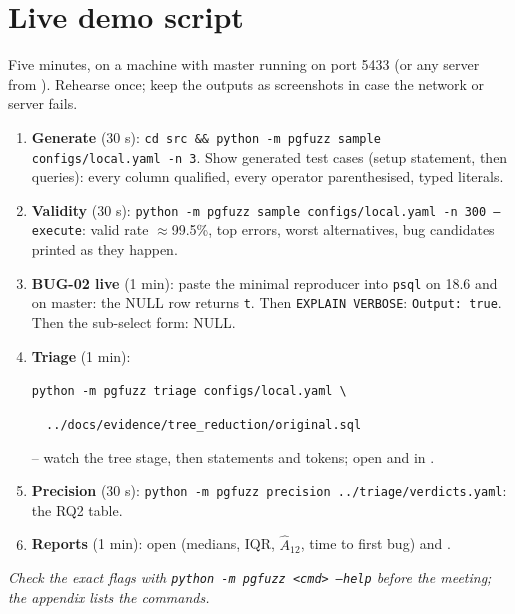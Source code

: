 \section{Live demo script}
\label{sec:demo}

Five minutes, on a machine with master running on port 5433 (or any server
from ). Rehearse once; keep the outputs as
screenshots in case the network or server fails.

\begin{enumerate}
  \item \textbf{Generate} (30 s): \texttt{cd src \&\& python -m pgfuzz sample
    configs/local.yaml -n 3}. Show generated test cases (setup statement, then
    queries): every column qualified, every operator parenthesised, typed
    literals.
  \item \textbf{Validity} (30 s): \texttt{python -m pgfuzz sample configs/local.yaml
    -n 300 --execute}: valid rate $\approx$99.5\%, top errors, worst
    alternatives, bug candidates printed as they happen.
  \item \textbf{BUG-02 live} (1 min): paste the minimal reproducer into
    \texttt{psql} on 18.6 and on master: the NULL row returns \texttt{t}.
    Then \texttt{EXPLAIN VERBOSE}: \texttt{Output: true}. Then the sub-select
    form: NULL.
  \item \textbf{Triage} (1 min): \par\texttt{python -m pgfuzz triage configs/local.yaml \textbackslash}\par
    \texttt{\ \ ../docs/evidence/tree\_reduction/original.sql}\par -- watch
    the tree stage, then statements and tokens; open  and
     in .
  \item \textbf{Precision} (30 s): \texttt{python -m pgfuzz precision
    ../triage/verdicts.yaml}: the RQ2 table.
  \item \textbf{Reports} (1 min): open 
    (medians, IQR, $\hat A_{12}$, time to first bug) and .
\end{enumerate}
\emph{Check the exact flags with \texttt{python -m pgfuzz <cmd> --help} before
the meeting; the appendix lists the commands.}

